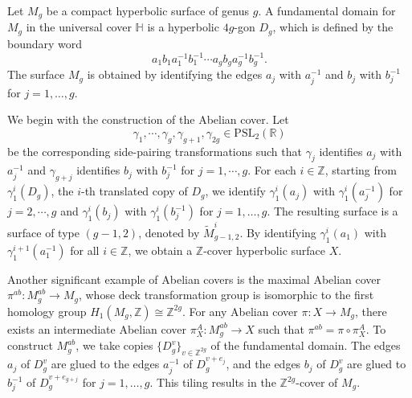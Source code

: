 \documentclass[11pt,oneside,reqno]{amsart}
\newcommand\Z{\ensuremath{\mathbb{Z}}}
\theoremstyle{definition}
\numberwithin{equation}{section}
\theoremstyle{plain}
\begin{document}
Let $M_g$ be a compact hyperbolic surface of genus $g$. A fundamental domain for $M_g$ in the universal cover $\mathbb{H}$ is a hyperbolic $4g$-gon $D_g$, which is defined by the boundary word 
\begin{equation*}
    a_{1}b_{1}a_{1}^{-1}b_{1}^{-1}\cdots a_{g}b_{g}a_{g}^{-1}b_{g}^{-1}.
\end{equation*}
The surface $M_g$ is obtained by identifying the edges $a_j$ with $a_j^{-1}$ and $b_j$ with $b_j^{-1}$ for $j=1,\dots,g$. 

We begin with the construction of the Abelian cover. Let 
\begin{equation*}
    \gamma_1,\cdots,\gamma_g,\gamma_{g+1}, \gamma_{2g} \in \mathrm{PSL}_2(\mathbb{R})
\end{equation*}
be the corresponding side-pairing transformations such that $\gamma_j$ identifies $a_j$ with $a_j^{-1}$ and $\gamma_{g+j}$ identifies $b_j$ with $b_j^{-1}$ for $j=1,\cdots,g$. For each $i\in \Z$, starting from $\gamma_1^i(D_g)$, the $i$-th translated copy of $D_g$, we identify $\gamma_1^i(a_j)$ with $\gamma_1^i(a^{-1}_j)$ for $j=2,\cdots,g$ and $\gamma_1^i(b_j)$ with $\gamma_1^i(b_j^{-1})$ for $j=1,\dots,g$. The resulting surface is a surface of type $(g-1,2)$, denoted by $\widetilde{M}_{g-1,2}^{i}$. By identifying $\gamma_1^{i}(a_1)$ with $\gamma_1^{i+1}(a_1^{-1})$ for all $i \in \mathbb{Z}$, we obtain a $\mathbb{Z}$-cover hyperbolic surface $X$.


Another significant example of Abelian covers is the maximal Abelian cover $\pi^{ab}: M^{ab}_g \to M_g$, whose deck transformation group is isomorphic to the first homology group $H_{1}(M_g, \mathbb{Z}) \cong \mathbb{Z}^{2g}$. For any Abelian cover $\pi: X \to M_g$, there exists an intermediate Abelian cover $\pi^A_{X}: M^{ab}_g \to X$ such that $\pi^{ab} = \pi \circ \pi^A_{X}$. To construct $M^{ab}_g$, we take copies $\{D_g^v\}_{v \in \mathbb{Z}^{2g}}$ of the fundamental domain. The edges $a_j$ of $D_g^v$ are glued to the edges $a_j^{-1}$ of $D_g^{v+e_j}$, and the edges $b_j$ of $D_g^v$ are glued to $b_j^{-1}$ of $D_g^{v+e_{g+j}}$ for $j=1,\dots,g$. This tiling results in the $\mathbb{Z}^{2g}$-cover of $M_g$.
\end{document}
